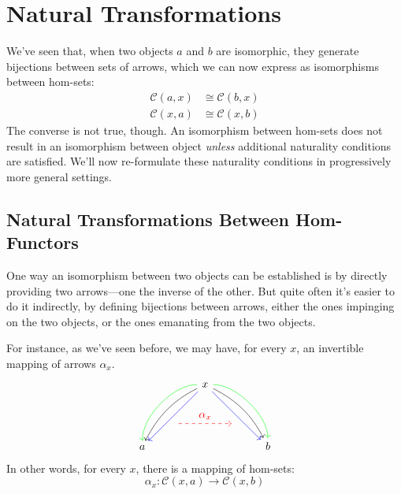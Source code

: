 \documentclass[DaoFP]{subfiles}
\begin{document}
\setcounter{chapter}{8}

\chapter{Natural Transformations}

We've seen that, when two objects $a$ and $b$ are isomorphic, they generate bijections between sets of arrows, which we can now express as isomorphisms between hom-sets:
\begin{align*}
\mathcal{C}(a, x) &\cong \mathcal{C}(b, x) \\
\mathcal{C}(x, a) &\cong \mathcal{C}(x, b)
\end{align*}
The converse is not true, though. An isomorphism between hom-sets does not result in an isomorphism between object \emph{unless} additional naturality conditions are satisfied. We'll now re-formulate these naturality conditions in progressively more general settings.

\section{Natural Transformations Between Hom-Functors}

One way an isomorphism between two objects can be established is by directly providing two arrows---one the inverse of the other. But quite often it's easier to do it indirectly, by defining bijections between arrows, either the ones impinging on the two objects, or the ones emanating from the two objects. 

For instance, as we've seen before, we may have, for every $x$, an invertible mapping of arrows $\alpha_x$.
\[
 \begin{tikzcd}
 \node(x) at (0, 2) {x};
 \node(a) at (-2, 0) {a};
 \node(b) at (2, 0) {b};
 \node(c1) at (-1, 1.5) {};
 \node(c2) at (-1.5, 1) {};
 \node(c3) at (-1, 2) {};
 \node(c4) at (-2, 1) {};
 \node(d1) at (1, 1.5) {};
 \node(d2) at (1.5, 1) {};
 \node(d3) at (1, 2) {};
 \node(d4) at (2, 1) {};
\node (aa) at (-1, 0.75) {};
 \node (bb) at (1, 0.75) {};
 \draw[->] (x) .. controls (c1)  and (c2) .. (a); %
 \draw[->, green] (x) .. controls (c3)  and (c4) .. (a); %
 \draw[->, blue] (x) -- (a); 
  \draw[->] (x) .. controls (d1)  and (d2) .. (b); %
 \draw[->, green] (x) .. controls (d3)  and (d4) .. (b); %
 \draw[->, blue] (x) -- (b); 
 \draw[->, red, dashed] (aa) -- node[above]{\alpha_x} (bb);
 \end{tikzcd}
\]
In other words, for every $x$, there is a mapping of hom-sets:
\[ \alpha_x \colon \mathcal{C}(x, a) \to \mathcal{C}(x, b) \]
\end{document}
